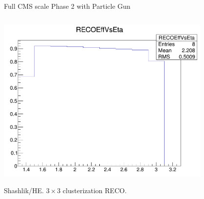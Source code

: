 \documentclass[pdf, 9pt]{beamer}
\begin{document}
\begin{frame}{Full CMS scale Phase 2 with Particle Gun}
\begin{columns}[T]
\begin{column}{0.5\textwidth}
        \includegraphics[width=0.8\textwidth, height=0.4\textheight]{figs/shashlik_fullscale/RECOEffVsEta.png}\\ \vspace{0.05cm}
        \begin{small}Shashlik/HE. $3 \times 3$ clusterization RECO.\end{small}
      \end{column}
    \end{columns}
  \end{frame}
\end{document}
